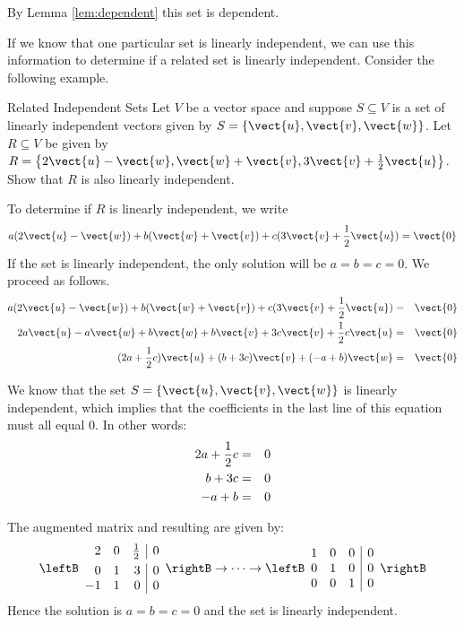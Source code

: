 By Lemma \ref{lem:dependent} this set is dependent. 

If we know that one particular set is linearly independent, we can use this information to determine if a related set is linearly independent. Consider the following example.

\begin{example}{Related Independent Sets}\label{exa:relatedindependent}
Let $V$ be a vector space and suppose $S \subseteq V$ is a set of linearly independent vectors given by $S = \left\{ \vect{u}, \vect{v}, \vect{w} \right\}$. Let $R \subseteq V$ be given by $R = \left\{ 2\vect{u} - \vect{w}, \vect{w} + \vect{v}, 3\vect{v} + \frac{1}{2} \vect{u} \right\}$. Show that $R$ is also linearly independent. 
\end{example}

\begin{solution}
To determine if $R$ is linearly independent, we write 
\[
a(2\vect{u} - \vect{w}) + b(\vect{w} + \vect{v}) + c( 3\vect{v} + \vspace{0.05in}\frac{1}{2}\vect{u}) = \vect{0} \]
If the set is linearly independent, the only solution will be $a=b=c=0$. We proceed as follows.  
\begin{eqnarray*}
a(2\vect{u} - \vect{w}) + b(\vect{w} + \vect{v}) + c( 3\vect{v} + \vspace{0.05in}\frac{1}{2} \vect{u}) &=& \vect{0} \\
2a\vect{u} - a\vect{w} + b\vect{w} + b\vect{v}  + 3c\vect{v} + \vspace{0.05in}\frac{1}{2}c\vect{u} &=& \vect{0}\\
(2a + \vspace{0.05in}\frac{1}{2}c) \vect{u} + (b+3c)\vect{v} + (-a + b) \vect{w} &=& \vect{0}
\end{eqnarray*}

We know that the set $S = \left\{ \vect{u}, \vect{v}, \vect{w} \right\}$ is linearly independent, which implies that the coefficients in the last line of this equation must all equal $0$. 
In other words:
\begin{eqnarray*}
2a + \vspace{0.05in}\frac{1}{2} c &=& 0 \\
b + 3c &=& 0 \\
-a + b &=& 0 
\end{eqnarray*}

The augmented matrix and resulting \rref \;are given by:
\[
\leftB \begin{array}{rrr|r}
2 & 0 & \vspace{0.05in}\frac{1}{2} & 0 \\
0 & 1 & 3 & 0 \\
-1 & 1 & 0 & 0 
\end{array}\rightB
\rightarrow \cdots \rightarrow
\leftB \begin{array}{rrr|r}
1 & 0 & 0 & 0 \\
0 & 1 & 0 & 0 \\
0 & 0 & 1 & 0 
\end{array}\rightB
\]
Hence the solution is $a=b=c=0$ and the set is linearly independent. 
\end{solution}

